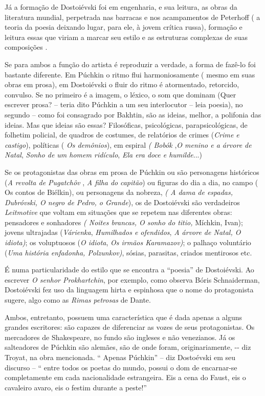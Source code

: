 Já a formação de Dostoiévski foi em engenharia, e sua leitura, as obras
da literatura mundial, perpetrada nas barracas e nos acampamentos de
Peterhoff ( a teoria da poesia deixando lugar, para ele, à jovem crítica
russa), formação e leitura essas que viriam a marcar seu estilo e as
estruturas complexas de suas composições .

Se para ambos a função do artista é reproduzir a verdade, a forma de
fazê-lo foi bastante diferente. Em Púchkin o ritmo flui harmoniosamente
( mesmo em suas obras em prosa), em Dostoiévski o fluir do ritmo é
atormentado, retorcido, convulso. Se no primeiro é a imagem, o léxico, o
som que dominam (Quer escrever prosa? -- teria dito Púchkin a um seu
interlocutor -- leia poesia), no segundo -- como foi consagrado por
Bakhtin, são as ideias, melhor, a polifonia das ideias. Mas que ideias
são essas? Filosóficas, psicológicas, parapsicológicas, de folhetim
policial, de quadros de costumes, de relatórios de crimes (\emph{Crime e
castigo}), políticas ( \emph{Os demônios}), em espiral \emph{( Bobók}
,\emph{O menino e a árvore de Natal}, \emph{Sonho de um homem ridículo},
\emph{Ela era doce e humilde}...)

Se os protagonistas das obras em prosa de Púchkin ou são personagens
históricos (\emph{A revolta de Pugatchôv} , \emph{A filha do}
\emph{capitão}) ou figuras do dia a dia, no campo ( Os contos de
Biélkin), ou personagens da nobreza, \emph{( A dama de espadas,
Dubróvski, O negro de Pedro, o Grande}), os de Dostoiévski são
verdadeiros \emph{Leitmotive} que voltam em situações que se repetem nas
diferentes obras: pensadores e sonhadores \emph{( Noites brancas, O
sonho do titio,} Míchkin, Ivan); jovens ultrajadas (\emph{Várienka},
\emph{Humilhados e ofendidos}, \emph{A árvore de Natal, O idiota)}; os
voluptuosos (\emph{O idiota}, \emph{Os irmãos Karamazov)}; o palhaço
voluntário (\emph{Uma história enfadonha, Polzunkov)}, sósias,
parasitas, criados mentirosos etc.

É numa particularidade do estilo que se encontra a ``poesia'' de
Dostoiévski. Ao escrever \emph{O senhor Prokhartchin}, por exemplo, como
observa Bóris Schnaiderman, Dostoiévski fez uso da linguagem hirta e
espinhosa que o nome do protagonista sugere, algo como as \emph{Rimas
petrosas} de Dante.

Ambos, entretanto, possuem uma característica que é dada apenas a alguns
grandes escritores: são capazes de diferenciar as vozes de seus
protagonistas. Os mercadores de Shakespeare, no fundo são ingleses e não
venezianos. Já os salteadores de Púchkin são alemães, são de onde foram,
originariamente, -\/- diz Troyat, na obra mencionada. `` Apenas
Púchkin'' -- diz Dostoévski em seu discurso -- `` entre todos os poetas
do mundo, possui o dom de encarnar-se completamente em cada
nacionalidade estrangeira. Eis a cena do Faust, eis o cavaleiro avaro,
eis o festim durante a peste!''

